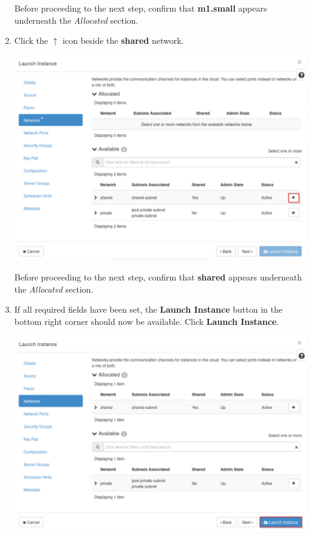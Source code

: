 \documentclass[letterpaper, 12pt]{article}
\begin{document}
\begin{enumerate}
    \begin{stopbox}
        Before proceeding to the next step, confirm that \textbf{m1.small} appears underneath the \textit{Allocated} section.
    \end{stopbox}

    \item Click the $\uparrow$ icon beside the \textbf{shared} network.

    \begin{center}
        \includegraphics[width=\linewidth]{images/part1/step9.png}
    \end{center}

    \begin{stopbox}
        Before proceeding to the next step, confirm that \textbf{shared} appears underneath the \textit{Allocated} section.
    \end{stopbox}

    \item If all required fields have been set, the \textbf{Launch Instance} button in the bottom right corner should now be available. Click \textbf{Launch Instance}.

    \begin{center}
        \includegraphics[width=\linewidth]{images/part1/step10.png}
    \end{center}


\end{enumerate}
\end{document}
